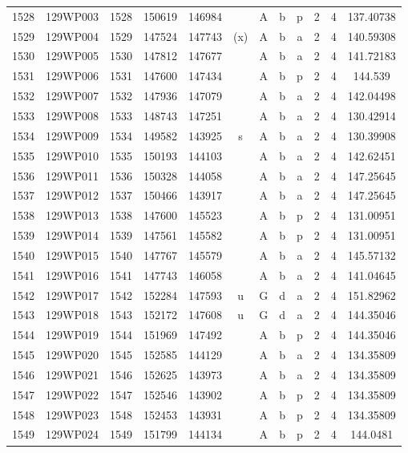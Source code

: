 \begin{tabular}{|*{12}{c|}}
1528 & 129WP003 & 1528 & 150619 & 146984 &  & A & b & p & 2 & 4 & 137.40738 \\ 
1529 & 129WP004 & 1529 & 147524 & 147743 & (x) & A & b & a & 2 & 4 & 140.59308 \\ 
1530 & 129WP005 & 1530 & 147812 & 147677 &  & A & b & a & 2 & 4 & 141.72183 \\ 
1531 & 129WP006 & 1531 & 147600 & 147434 &  & A & b & p & 2 & 4 & 144.539 \\ 
1532 & 129WP007 & 1532 & 147936 & 147079 &  & A & b & a & 2 & 4 & 142.04498 \\ 
1533 & 129WP008 & 1533 & 148743 & 147251 &  & A & b & a & 2 & 4 & 130.42914 \\ 
1534 & 129WP009 & 1534 & 149582 & 143925 & s & A & b & a & 2 & 4 & 130.39908 \\ 
1535 & 129WP010 & 1535 & 150193 & 144103 &  & A & b & a & 2 & 4 & 142.62451 \\ 
1536 & 129WP011 & 1536 & 150328 & 144058 &  & A & b & a & 2 & 4 & 147.25645 \\ 
1537 & 129WP012 & 1537 & 150466 & 143917 &  & A & b & a & 2 & 4 & 147.25645 \\ 
1538 & 129WP013 & 1538 & 147600 & 145523 &  & A & b & p & 2 & 4 & 131.00951 \\ 
1539 & 129WP014 & 1539 & 147561 & 145582 &  & A & b & p & 2 & 4 & 131.00951 \\ 
1540 & 129WP015 & 1540 & 147767 & 145579 &  & A & b & a & 2 & 4 & 145.57132 \\ 
1541 & 129WP016 & 1541 & 147743 & 146058 &  & A & b & a & 2 & 4 & 141.04645 \\ 
1542 & 129WP017 & 1542 & 152284 & 147593 & u & G & d & a & 2 & 4 & 151.82962 \\ 
1543 & 129WP018 & 1543 & 152172 & 147608 & u & G & d & a & 2 & 4 & 144.35046 \\ 
1544 & 129WP019 & 1544 & 151969 & 147492 &  & A & b & p & 2 & 4 & 144.35046 \\ 
1545 & 129WP020 & 1545 & 152585 & 144129 &  & A & b & a & 2 & 4 & 134.35809 \\ 
1546 & 129WP021 & 1546 & 152625 & 143973 &  & A & b & a & 2 & 4 & 134.35809 \\ 
1547 & 129WP022 & 1547 & 152546 & 143902 &  & A & b & p & 2 & 4 & 134.35809 \\ 
1548 & 129WP023 & 1548 & 152453 & 143931 &  & A & b & p & 2 & 4 & 134.35809 \\ 
1549 & 129WP024 & 1549 & 151799 & 144134 &  & A & b & p & 2 & 4 & 144.0481 \\ 

\end{tabular}
